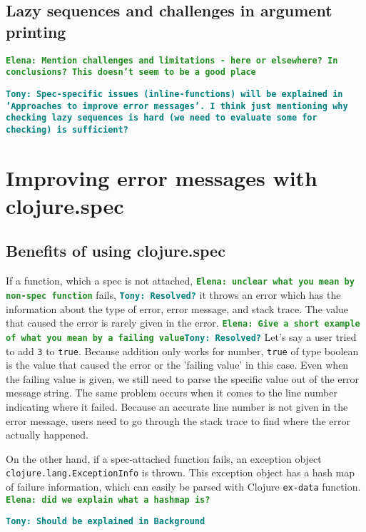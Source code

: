 \documentclass[12pt]{article}
\newcommand{\comment}[1]{{\bf \tt  {#1}}}
\newcommand{\emcomment}[1]{\textcolor{ForestGreen}{\comment{Elena: {#1}}}}
\newcommand{\tscomment}[1]{\textcolor{Teal}{\comment{Tony: {#1}}}}
\begin{document}
\subsection{Lazy sequences and challenges in argument printing}



\emcomment{Mention challenges and limitations - here or elsewhere? In conclusions? 
This doesn't seem to be a good place}

\tscomment{Spec-specific issues (inline-functions) will be explained in 'Approaches to improve error messages'. I think 
just mentioning why checking lazy sequences is hard (we need to evaluate some for checking) is sufficient?}

\section{Improving error messages with clojure.spec}
	\subsection{Benefits of using clojure.spec}
	If a function, which a spec is not attached, \emcomment{unclear what you mean by non-spec function} fails,
	\tscomment{Resolved?} 
	it throws an error which has the information about the type of error, error message, and stack 
	trace. The value that caused the error is rarely given in the error. 
	\emcomment{Give a short example of what you mean by a failing value}\tscomment{Resolved?}
	Let's say a user tried to add {\tt 3} to {\tt true}. Because addition only works for number, 
	{\tt true} of type boolean is the value that caused the error or the 'failing value' in this case.
	Even when the failing value is given, we still need to parse the specific value out of 
	the error message string. The same problem occurs when it comes to the line number indicating where it failed. 
	Because an accurate line number is not given in the error message, users need to go through the stack trace to find 
	where the error actually happened. 

	On the other hand, if a spec-attached function fails, an exception object {\tt clojure.lang.ExceptionInfo} is thrown. 
	This exception object has a hash map of failure information, which can easily be 
	parsed with Clojure {\tt ex-data} function. \emcomment{did we explain what a hashmap is?}
	
	\tscomment{Should be explained in Background}
\end{document}
